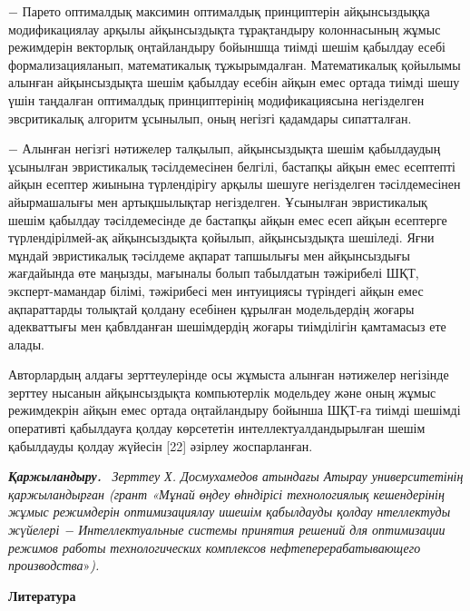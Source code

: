 \begin{multicols}{2}
− Парето оптималдық максимин оптималдық принциптерін айқынсыздыққа
модификациялау арқылы айқынсыздықта тұрақтандыру колоннасының жұмыс
режимдерін векторлық оңтайландыру бойыншща тиімді шешім қабылдау есебі
формализацияланып, математикалық тұжырымдалған. Математикалық қойылымы
алынған айқынсыздықта шешім қабылдау есебін айқын емес ортада тиімді
шешу үшін таңдалған оптималдық принциптерінің модификациясына
негізделген эвсритикалық алгоритм ұсынылып, оның негізгі қадамдары
сипатталған.

− Алынған негізгі нәтижелер талқылып, айқынсыздықта шешім қабылдаудың
ұсынылған эвристикалық тәсілдемесінен белгілі, бастапқы айқын емес
есептепті айқын есептер жиынына түрлендірігу арқылы шешуге негізделген
тәсілдемесінен айырмашалығы мен артықшылықтар негізделген. Ұсынылған
эвристикалық шешім қабылдау тәсілдемесінде де бастапқы айқын емес есеп
айқын есептерге түрлендірілмей-ақ айқынсыздықта қойылып, айқынсыздықта
шешіледі. Яғни мұндай эвристикалық тәсілдеме ақпарат тапшылығы мен
айқынсыздығы жағдайында өте маңызды, мағыналы болып табылдатын
тәжірибелі ШҚТ, эксперт-мамандар білімі, тәжірибесі мен интуициясы
түріндегі айқын емес ақпараттарды толықтай қолдану есебінен құрылған
модельдердің жоғары адекваттығы мен қабвлданған шешімдердің жоғары
тиімділігін қамтамасыз ете алады.

Авторлардың алдағы зерттеулерінде осы жұмыста алынған нәтижелер
негізінде зерттеу нысанын айқынсыздықта компьютерлік модельдеу және оның
жұмыс режимдекрін айқын емес ортада оңтайландыру бойынша ШҚТ-ға тиімді
шешімді оперативті қабылдауға қолдау көрсететін интеллектуалдандырылған
шешім қабылдауды қолдау жүйесін {[}22{]} әзірлеу жоспарланған.

\emph{{\bfseries Қаржыландыру.}} ~\emph{Зерттеу Х. Досмухамедов атындағы
Атырау университетінің қаржыландырған (грант «Мұнай өңдеу өһндірісі
технологиялық кешендерінің жұмыс режимдерін оптимизациялау ишешім
қабылдауды қолдау нтеллектуды жүйелері − Интеллектуальные системы
принятия решений для оптимизации режимов работы технологических
комплексов нефтеперерабатывающего производства}»\emph{).}
\end{multicols}


\begin{center}
    {\bfseries Литература}
\end{center}

